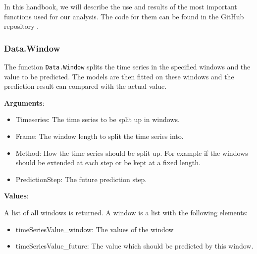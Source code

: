 In this handbook, we will describe the use and results of the most important functions used for our analysis.  The code for them can be found in the GitHub repository \textcite{GitHub}. 

\subsubsection{Data.Window}
\label{sec: Data.Window}

The function \texttt{Data.Window} splits the time series in the specified windows and the value to be predicted. The models are then fitted on these windows and the prediction result can compared with the actual value.

\textbf{Arguments}:

\begin{itemize}
	\item Timeseries: The time series to be split up in windows.
	\item Frame: The window length to split the time series into.
	\item Method: How the time series should be split up. For example if the windows should be extended at each step or be kept at a fixed length.
	\item PredictionStep: The future prediction step.
\end{itemize}

\textbf{Values}:

A list of all windows is returned. A window is a list with the following elements: 

\begin{itemize}
	\item timeSeriesValue\_window: The values of the window
	\item timeSeriesValue\_future: The value which should be predicted by this window. 
\end{itemize}

